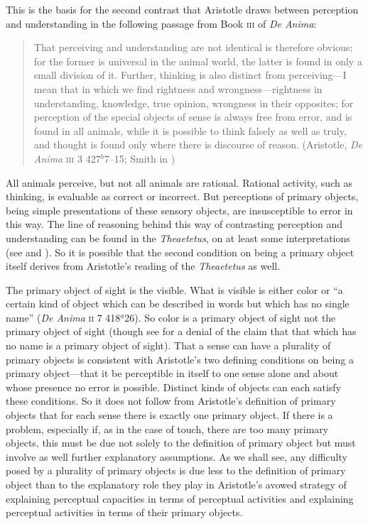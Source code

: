 This is the basis for the second contrast that Aristotle draws between perception and understanding in the following passage from Book \textsc{iii} of \emph{De Anima}:
\begin{quote}
	That perceiving and understanding are not identical is therefore obvious; for the former is universal in the animal world, the latter is found in only a small division of it. Further, thinking is also distinct from perceiving---I mean that in which we find rightness and wrongness---right\-ness in understanding, knowledge, true opinion, wrongness in their opposites; for perception of the special objects of sense is always free from error, and is found in all animals, while it is possible to think falsely as well as truly, and thought is found only where there is discourse of reason. (Aristotle, \emph{De Anima} \textsc{iii} 3 427\( ^{b} \)7--15; Smith in \citealt[49]{Barnes:1984uq})
\end{quote}
All animals perceive, but not all animals are rational. Rational activity, such as thinking, is evaluable as correct or incorrect. But perceptions of primary objects, being simple presentations of these sensory objects, are insusceptible to error in this way. The line of reasoning behind this way of contrasting perception and understanding can be found in the \emph{Theaetetus}, on at least some interpretations (see \citealt{Cooper:1970kx} and \citealt{Burnyeat:1990dp}). So it is possible that the second condition on being a primary object itself derives from Aristotle's reading of the \emph{Theaetetus} as well.

The primary object of sight is the visible. What is visible is either color or ``a certain kind of object which can be described in words but which has no single name'' (\emph{De Anima} \textsc{ii} 7 418\( ^{a} \)26). So color is a primary object of sight not the primary object of sight (though see \citealt[252]{Polansky:2007ly} for a denial of the claim that that which has no name is a primary object of sight). That a sense can have a plurality of primary objects is consistent with Aristotle's two defining conditions on being a primary object---that it be perceptible in itself to one sense alone and about whose presence no error is possible. Distinct kinds of objects can each satisfy these conditions. So it does not follow from Aristotle's definition of primary objects that for each sense there is exactly one primary object. If there is a problem, especially if, as in the case of touch, there are too many primary objects, this must be due not solely to the definition of primary object but must involve as well further explanatory assumptions. As we shall see, any difficulty posed by a plurality of primary objects is due less to the definition of primary object than to the explanatory role they play in Aristotle's avowed strategy of explaining perceptual capacities in terms of perceptual activities and explaining perceptual activities in terms of their primary objects.

